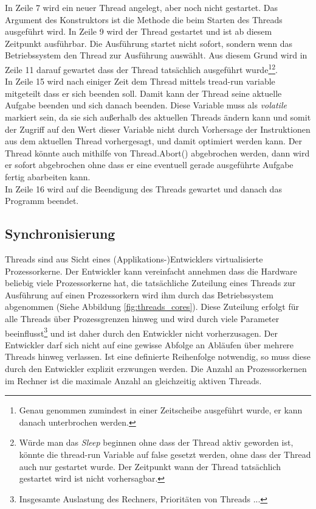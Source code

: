 In Zeile 7 wird ein neuer Thread angelegt, aber noch nicht gestartet. Das Argument des Konstruktors ist die Methode die beim Starten des Threads ausgeführt wird. In Zeile 9 wird der Thread gestartet und ist ab diesem Zeitpunkt ausführbar. Die Ausführung startet nicht sofort, sondern wenn das Betriebssystem den Thread zur Ausführung auswählt. Aus diesem Grund wird in Zeile 11 darauf gewartet dass der Thread tatsächlich ausgeführt wurde\footnote{Genau genommen zumindest in einer Zeitscheibe ausgeführt wurde, er kann danach unterbrochen werden.}\footnote{Würde man das \textit{Sleep} beginnen ohne dass der Thread aktiv geworden ist, könnte die thread-run Variable auf false gesetzt werden, ohne dass der Thread auch nur gestartet wurde. Der Zeitpunkt wann der Thread tatsächlich gestartet wird ist nicht vorhersagbar.}.
\\In Zeile 15 wird nach einiger Zeit dem Thread mittels tread-run variable mitgeteilt dass er sich beenden soll. Damit kann der Thread seine aktuelle Aufgabe beenden und sich danach beenden. Diese Variable muss als \emph{volatile} markiert sein, da sie sich außerhalb des aktuellen Threads ändern kann und somit der Zugriff auf den Wert dieser Variable nicht durch Vorhersage der Instruktionen aus dem aktuellen Thread vorhergesagt, und damit optimiert werden kann.\parencite{ms_volatile} Der Thread könnte auch mithilfe von Thread.Abort() abgebrochen werden, dann wird er sofort abgebrochen ohne dass er eine eventuell gerade ausgeführte Aufgabe fertig abarbeiten kann. 
\\In Zeile 16 wird auf die Beendigung des Threads gewartet und danach das Programm beendet.


\subsection{Synchronisierung}
Threads sind aus Sicht eines (Applikations-)Entwicklers virtualisierte Prozessorkerne. Der Entwickler kann vereinfacht annehmen dass die Hardware beliebig viele Prozessorkerne hat, die tatsächliche Zuteilung eines Threads zur Ausführung auf einen Prozessorkern wird ihm durch das Betriebssystem abgenommen (Siehe Abbildung \ref{fig:threads_cores}). Diese Zuteilung erfolgt für alle Threads über Prozessgrenzen hinweg und wird durch viele Parameter beeinflusst\footnote{Insgesamte Auslastung des Rechners, Prioritäten von Threads ...} und ist daher durch den Entwickler nicht vorherzusagen. Der Entwickler darf sich nicht auf eine gewisse Abfolge an Abläufen über mehrere Threads hinweg verlassen. Ist eine definierte Reihenfolge notwendig, so muss diese durch den Entwickler explizit erzwungen werden. Die Anzahl an Prozessorkernen im Rechner ist die maximale Anzahl an gleichzeitig aktiven Threads.\parencite[S. 140]{Dahlin2012}

